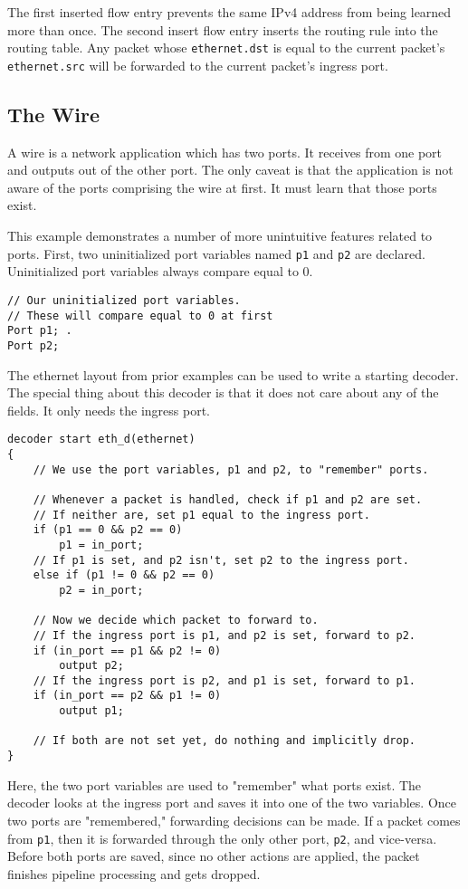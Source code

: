 The first inserted flow entry prevents the same IPv4 address from being learned
more than once. The second insert flow entry inserts the routing rule into the
routing table. Any packet whose \texttt{ethernet.dst} is equal to the current
packet's \texttt{ethernet.src} will be forwarded to the current packet's ingress
port.

\subsection{The Wire} \label{tut:wire}

A wire is a network application which has two ports. It receives from one port
and outputs out of the other port. The only caveat is that the application is
not aware of the ports comprising the wire at first. It must learn that those
ports exist.

This example demonstrates a number of more unintuitive features related to
ports. First, two uninitialized port variables named \texttt{p1} and
\texttt{p2} are declared. Uninitialized port variables always compare equal to 0.

\begin{codepage}
\begin{lstlisting}
// Our uninitialized port variables.
// These will compare equal to 0 at first
Port p1; .
Port p2;
\end{lstlisting}
\end{codepage}

The ethernet layout from prior examples can be used to write a starting decoder. The
special thing about this decoder is that it does not care about any of the fields.
It only needs the ingress port.

\begin{codepage}
\begin{lstlisting}
decoder start eth_d(ethernet)
{
	// We use the port variables, p1 and p2, to "remember" ports.

	// Whenever a packet is handled, check if p1 and p2 are set.
	// If neither are, set p1 equal to the ingress port.
	if (p1 == 0 && p2 == 0)
		p1 = in_port;
	// If p1 is set, and p2 isn't, set p2 to the ingress port.
	else if (p1 != 0 && p2 == 0)
		p2 = in_port;

	// Now we decide which packet to forward to.
	// If the ingress port is p1, and p2 is set, forward to p2.
	if (in_port == p1 && p2 != 0)
		output p2;
	// If the ingress port is p2, and p1 is set, forward to p1.
	if (in_port == p2 && p1 != 0)
		output p1;

	// If both are not set yet, do nothing and implicitly drop.
}
\end{lstlisting}
\end{codepage}

Here, the two port variables are used to "remember" what ports exist. The decoder
looks at the ingress port and saves it into one of the two variables. Once two
ports are "remembered," forwarding decisions can be made. If a packet comes from
\texttt{p1}, then it is forwarded through the only other port, \texttt{p2}, and
vice-versa. Before both ports are saved, since no other actions are applied, the
packet finishes pipeline processing and gets dropped.

